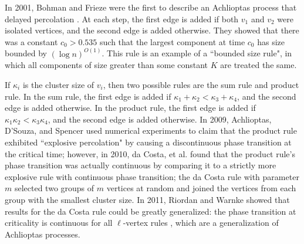 \documentclass[twoside,10pt]{article}
\begin{document}
In 2001, Bohman and Frieze were the first to describe an Achlioptas process that delayed percolation \cite{BF}. At each step, the first edge is added if both $v_1$ and $v_2$ were isolated vertices, and the second edge is added otherwise. They showed that there was a constant $c_0>0.535$ such that the largest component at time $c_0$ has size bounded by $(\log n)^{O(1)}$. This rule is an example of a ``bounded size rule", in which all components of size greater than some constant $K$ are treated the same.

If $\kappa_i$ is the cluster size of $v_{i}$, then two possible rules are the sum rule and product rule. In the sum rule, the first edge is added if $\kappa_1+\kappa_2 < \kappa_3+\kappa_4$, and the second edge is added otherwise. In the product rule, the first edge is added if $\kappa_1 \kappa_2 < \kappa_3 \kappa_4$, and the second edge is added otherwise. In 2009, Achlioptas, D'Souza, and Spencer \cite{discontinuous} used numerical experiments to claim that the product rule exhibited ``explosive percolation" by causing a discontinuous phase transition at the critical time; however, in 2010, da Costa, et al. \cite{dacosta2010} found that the product rule's phase transition was actually continuous by comparing it to a strictly more explosive rule with continuous phase transition; the da Costa rule with parameter $m$ selected two groups of $m$ vertices at random and joined the vertices from each group with the smallest cluster size. In 2011, Riordan and Warnke showed that results for the da Costa rule could be greatly generalized: the phase transition at criticality is continuous for all $\ell$-vertex rules \cite{RW-cont}, which are a generalization of Achlioptas processes.
\end{document}
